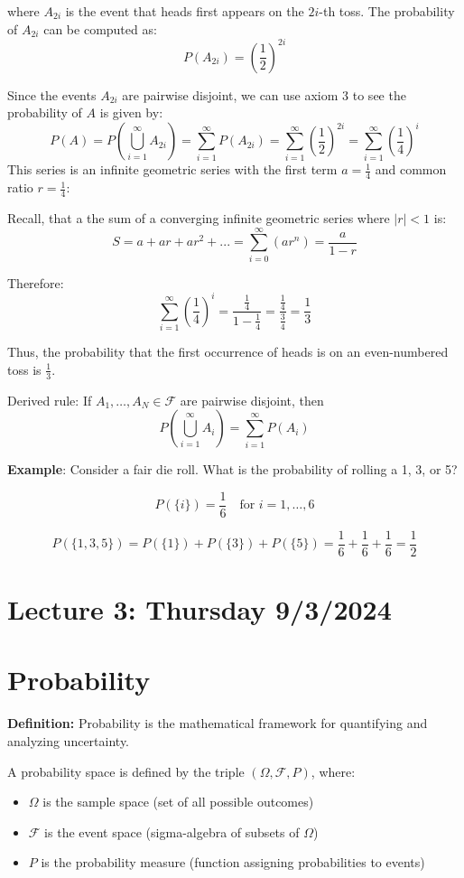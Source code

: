 \documentclass{article}
\begin{document}
where \( A_{2i} \) is the event that heads first appears on the \( 2i \)-th toss. The probability of \( A_{2i} \) can be computed as:
\[
P(A_{2i}) = \left(\frac{1}{2}\right)^{2i}
\]

Since the events \( A_{2i} \) are pairwise disjoint, we can use axiom 3 to see the probability of \( A \) is given by:
\[
P(A) = P\left(\bigcup_{i=1}^{\infty} A_{2i}\right)
= \sum_{i=1}^{\infty} P(A_{2i}) 
= \sum_{i=1}^{\infty} \left(\frac{1}{2}\right)^{2i} = \sum_{i=1}^{\infty} \left(\frac{1}{4}\right)^{i}
\]
This series is an infinite geometric series with the first term \( a = \frac{1}{4} \) and common ratio \( r = \frac{1}{4} \): 

Recall, that a the sum of a converging infinite geometric series where \(|r| < 1\) is:
\[
S = a+ar+ar^2+... = \sum_{i=0}^{\infty} \left(ar^n\right) = \frac{a}{1 - r}
\]

Therefore:
\[
\sum_{i=1}^{\infty} \left(\frac{1}{4}\right)^i = \frac{\frac{1}{4}}{1 - \frac{1}{4}} = \frac{\frac{1}{4}}{\frac{3}{4}} = \frac{1}{3}
\]

Thus, the probability that the first occurrence of heads is on an even-numbered toss is \( \boxed{\frac{1}{3}} \).


Derived rule: If \( A_1, \dots, A_N \in \mathcal{F} \) are pairwise disjoint, then 
\[
P\left(\bigcup_{i=1}^{\infty} A_i\right) = \sum_{i=1}^{\infty} P(A_i)
\]

\textbf{Example}: Consider a fair die roll. What is the probability of rolling a 1, 3, or 5?

\[
P(\{i\}) = \frac{1}{6} \quad \text{for } i = 1, \dots, 6
\]

\[
P(\{1, 3, 5\}) = P(\{1\}) + P(\{3\}) + P(\{5\}) = \frac{1}{6} + \frac{1}{6} + \frac{1}{6} = \frac{1}{2}
\]


\section*{Lecture 3: Thursday 9/3/2024}
\section{Probability}

\textbf{Definition:} Probability is the mathematical framework for quantifying and analyzing uncertainty.

A probability space is defined by the triple \( (\Omega, \mathcal{F}, P) \), where:
\begin{itemize}
    \item \( \Omega \) is the sample space (set of all possible outcomes)
    \item \( \mathcal{F} \) is the event space (sigma-algebra of subsets of \( \Omega \))
    \item \( P \) is the probability measure (function assigning probabilities to events)
\end{itemize}
\end{document}

